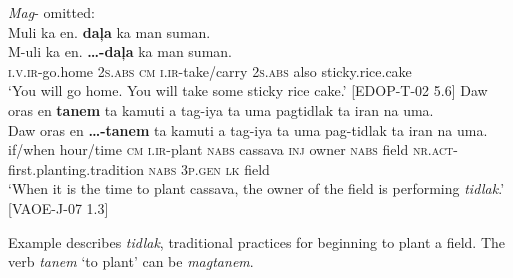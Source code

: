 \newpage
\ea
\textit{Mag}{}- omitted: \\
Muli  ka  en.  \textbf{daļa}  ka  man  suman. \\\smallskip
 \gll M-uli  ka  en.  \textbf{…-daļa}  ka  man  suman. \\
\textsc{i.v.ir}-go.home  2\textsc{s.abs}  \textsc{cm}  \textsc{i.ir}-take/carry  2\textsc{s.abs}  also  sticky.rice.cake \\
\glt ‘You will go home. You will take some sticky rice cake.’ [EDOP-T-02 5.6]
\z
\ea
\label{ex:tidlak}
Daw  oras  en  \textbf{tanem}  ta  kamuti  a  tag-iya  ta  uma pagtidlak  ta  iran  na  uma. \\\smallskip
 \gll Daw  oras  en  \textbf{…-tanem}  ta  kamuti  a  tag-iya  ta  uma pag-tidlak  ta  iran  na  uma. \\
if/when  hour/time  \textsc{cm}  \textsc{i.ir}-plant  \textsc{nabs}  cassava  \textsc{inj}  owner  \textsc{nabs}  field
\textsc{nr.act}-first.planting.tradition  \textsc{nabs}  3\textsc{p.gen}  \textsc{lk}  field \\
\glt `When it is the time to plant cassava, the owner of the field is performing \textit{tidlak}.' [VAOE-J-07 1.3]
\z

Example  describes \textit{tidlak}, traditional practices for beginning to plant a field. The verb \textit{tanem} ‘to plant’ can be \textit{magtanem}. 

